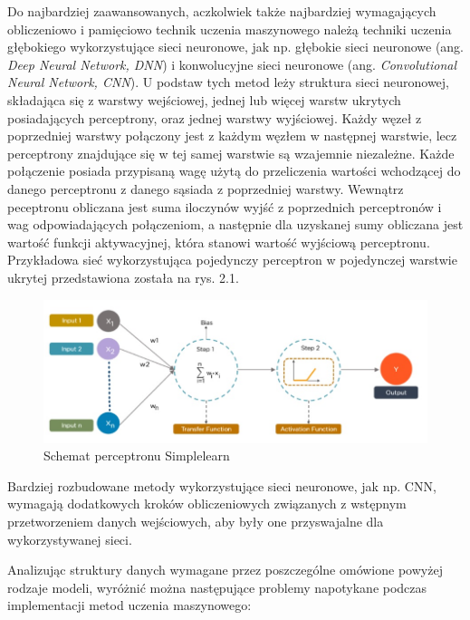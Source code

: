 Do najbardziej zaawansowanych, aczkolwiek także najbardziej wymagających obliczeniowo i pamięciowo technik uczenia maszynowego należą techniki uczenia głębokiego wykorzystujące sieci neuronowe, jak np. głębokie sieci neuronowe (ang. \textit{Deep Neural Network, DNN}) i konwolucyjne sieci neuronowe (ang. \textit{Convolutional Neural Network, CNN}). U podstaw tych metod leży struktura sieci neuronowej, składająca się z warstwy wejściowej, jednej lub więcej warstw ukrytych posiadających perceptrony, oraz jednej warstwy wyjściowej. Każdy węzeł z poprzedniej warstwy połączony jest z każdym węzłem w następnej warstwie, lecz perceptrony znajdujące się w tej samej warstwie są wzajemnie niezależne. Każde połączenie posiada przypisaną wagę użytą do przeliczenia wartości wchodzącej do danego perceptronu z danego sąsiada z poprzedniej warstwy. Wewnątrz peceptronu obliczana jest suma iloczynów wyjść z poprzednich perceptronów i wag odpowiadających połączeniom, a następnie dla uzyskanej sumy obliczana jest wartość funkcji aktywacyjnej, która stanowi wartość wyjściową perceptronu. Przykładowa sieć wykorzystująca pojedynczy perceptron w pojedynczej warstwie ukrytej przedstawiona została na rys. 2.1. 
\begin{figure}[!ht]
    \centering
    \includegraphics[width=150mm]{Rysunki/Rozdzial2/perceptron.jpg}
    \caption{Schemat perceptronu \dywiz{} Simplelearn}
    \label{fig:my_label}
\end{figure}

Bardziej rozbudowane metody wykorzystujące sieci neuronowe, jak np. CNN, wymagają dodatkowych kroków obliczeniowych związanych z wstępnym przetworzeniem danych wejściowych, aby były one przyswajalne dla wykorzystywanej sieci.

Analizując struktury danych wymagane przez poszczególne omówione powyżej rodzaje modeli, wyróżnić można następujące problemy napotykane podczas implementacji metod uczenia maszynowego:

